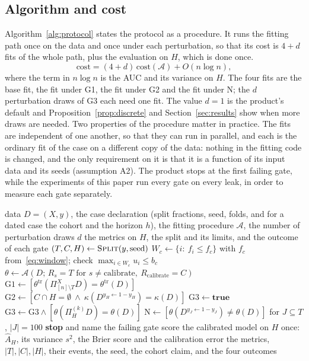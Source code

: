 \subsection{Algorithm and cost}

Algorithm~\ref{alg:protocol} states the protocol as a procedure. It runs the fitting path once on the data and once under each perturbation, so that its cost is $4+d$ fits of the whole path, plus the evaluation on $H$, which is done once.
\begin{equation}
\mathrm{cost}=(4+d)\,\mathrm{cost}(\mathcal A)+O(n\log n),
\label{eq:cost}
\end{equation}
where the term in $n\log n$ is the AUC and its variance on $H$. The four fits are the base fit, the fit under G1, the fit under G2 and the fit under N; the $d$ perturbation draws of G3 each need one fit. The value $d=1$ is the product's default and Proposition~\ref{prop:discrete} and Section~\ref{sec:results} show when more draws are needed. Two properties of the procedure matter in practice. The fits are independent of one another, so that they can run in parallel, and each is the ordinary fit of the case on a different copy of the data: nothing in the fitting code is changed, and the only requirement on it is that it is a function of its input data and its seeds (assumption A2). The product stops at the first failing gate, while the experiments of this paper run every gate on every leak, in order to measure each gate separately.

\begin{algorithm}[htbp]
\caption{The leakage-safe protocol for one case.}
\label{alg:protocol}
\begin{algorithmic}[1]
\Require data $D=(X,y)$, the case declaration (split fractions, seed, folds, and for a dated case the cohort and the horizon $h$), the fitting procedure $\mathcal A$, the number of perturbation draws $d$
\Ensure the metrics on $H$, the split and its limits, and the outcome of each gate
\State $(T,C,H)\gets\textsc{Split}(y,\text{seed})$ 
  \State $W_c\gets\{i:\ f_i\le f_c\}$ with $f_c$ from~\eqref{eq:window}; check $\max_{i\in W_c}u_i\le b_c$
\EndIf
\State $\theta\gets\mathcal A(D;\,R_s=T\text{ for }s\ne\text{calibrate},\ R_{\text{calibrate}}=C)$ 
\State $\mathrm{G1}\gets[\theta^{\mathrm{tr}}(\Pi^{X}_{[n]\setminus T}D)=\theta^{\mathrm{tr}}(D)]$
\State $\mathrm{G2}\gets[C\cap H=\emptyset\ \wedge\ \kappa(D^{y_H\leftarrow1-y_H})=\kappa(D)]$
\State $\mathrm{G3}\gets\textbf{true}$
  \State $\mathrm{G3}\gets\mathrm{G3}\wedge[\theta(\Pi_H^{(k)}D)=\theta(D)]$
\EndFor
\State $\mathrm{N}\gets[\theta(D^{y_J\leftarrow1-y_J})\neq\theta(D)]$ for $J\subseteq T$, $|J|=100$
  \State \textbf{stop} and name the failing gate
\EndIf
\State score the calibrated model on $H$ once: $\hat A_H$, its variance $s^2$, the Brier score and the calibration error
\State \Return the metrics, $|T|,|C|,|H|$, their events, the seed, the cohort claim, and the four outcomes
\end{algorithmic}
\end{algorithm}

